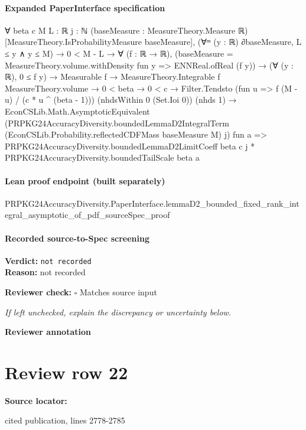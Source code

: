 \documentclass[10pt]{article}
\newcommand{\reviewerbox}{%
  \par\noindent\fbox{\parbox{0.96\linewidth}{\rule{0pt}{0.38in}}}\par
}
\newcommand{\reviewmatch}[1]{%
  \par\noindent\textbf{Reviewer check:} $\square$\; #1\par
  \noindent\emph{If left unchecked, explain the discrepancy or uncertainty below.}\par
}
\begin{document}
\paragraph{Expanded PaperInterface specification}
\begin{ReviewVerbatim}
∀ {beta c M L : ℝ} {j : ℕ} (baseMeasure : MeasureTheory.Measure ℝ) [MeasureTheory.IsProbabilityMeasure baseMeasure],
  (∀ᵐ (y : ℝ) ∂baseMeasure, L ≤ y ∧ y ≤ M) →
    0 < M - L →
      ∀ (f : ℝ → ℝ),
        (baseMeasure = MeasureTheory.volume.withDensity fun y => ENNReal.ofReal (f y)) →
          (∀ (y : ℝ), 0 ≤ f y) →
            Measurable f →
              MeasureTheory.Integrable f MeasureTheory.volume →
                0 < beta →
                  0 < c →
                    Filter.Tendsto (fun u => f (M - u) / (c * u ^ (beta - 1))) (nhdsWithin 0 (Set.Ioi 0)) (nhds 1) →
                      EconCSLib.Math.AsymptoticEquivalent
                        (PRPKG24AccuracyDiversity.boundedLemmaD2IntegralTerm
                          (EconCSLib.Probability.reflectedCDFMass baseMeasure M) j)
                        fun a =>
                        PRPKG24AccuracyDiversity.boundedLemmaD2LimitCoeff beta c j *
                          PRPKG24AccuracyDiversity.boundedTailScale beta a
\end{ReviewVerbatim}

\paragraph{Lean proof endpoint (built separately)}\begin{ReviewVerbatim}
PRPKG24AccuracyDiversity.PaperInterface.lemmaD2_bounded_fixed_rank_integral_asymptotic_of_pdf_sourceSpec_proof
\end{ReviewVerbatim}

\paragraph{Recorded source-to-Spec screening}
\textbf{Verdict:} \texttt{not recorded}
\\
\textbf{Reason:} not recorded
\reviewmatch{Matches source input}
\noindent\textbf{Reviewer annotation}\par
\reviewerbox
\clearpage
\hypertarget{source-claim-dcffa0731fd7e8dc}{}
\section*{Review row 22}
\textbf{Source locator:} {\footnotesize\raggedright cited publication, lines 2778-\allowbreak{}2785\par}
\end{document}
